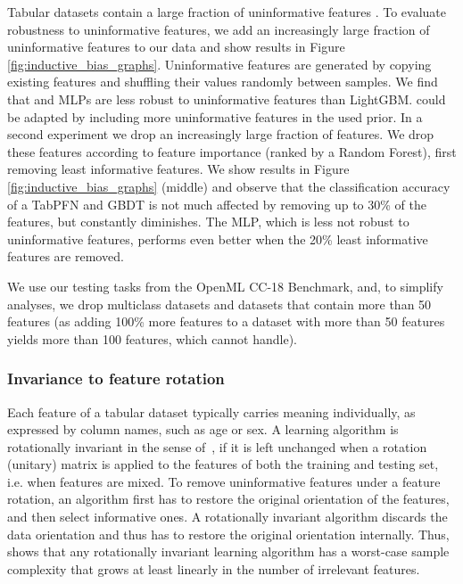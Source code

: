 \documentclass{article}
\begin{document}
Tabular datasets contain a large fraction of uninformative features \citep{grinsztajn2022why}. To evaluate robustness to uninformative features, we add an increasingly large fraction of uninformative features to our data and show results in Figure \ref{fig:inductive_bias_graphs}. Uninformative features are generated by copying existing features and shuffling their values randomly between samples. We find that \methodname{} and MLPs are less robust to uninformative features than LightGBM. \methodname{} could be adapted by including more uninformative features in the used prior.
In a second experiment we drop an increasingly large fraction of features. We drop these features according to feature importance (ranked by a Random Forest), first removing least informative features. We show results in Figure \ref{fig:inductive_bias_graphs} (middle) and observe that the classification accuracy of a TabPFN and GBDT is not much affected by removing up to 30\% of the features, but constantly diminishes. The MLP, which is less not robust to uninformative features, performs even better when the 20\% least informative features are removed.

We use our testing tasks from the OpenML CC-18 Benchmark, and, to simplify analyses, we drop multiclass datasets and datasets that contain more than 50 features (as adding 100\% more features to a dataset with more than 50 features yields more than 100 features, which \methodname{} cannot handle).

\subsubsection{Invariance to feature rotation}
\label{sec:app:rotation_invariance}
Each feature of a tabular dataset typically carries meaning individually, as expressed by column names, such as age or sex. A learning algorithm is rotationally invariant in the sense of~\cite{ng2004feature}, if it is left unchanged when a rotation (unitary) matrix is applied to the features of both the training and testing set, i.e. when features are mixed. To remove uninformative features under a feature rotation, an algorithm first has to restore the original orientation of the features, and then select informative ones. A rotationally invariant algorithm discards the data orientation and thus has to restore the original orientation internally. Thus, \cite{ng2004feature} shows that any rotationally invariant learning algorithm has a worst-case sample complexity that grows at least linearly in the number of irrelevant features.
\end{document}

